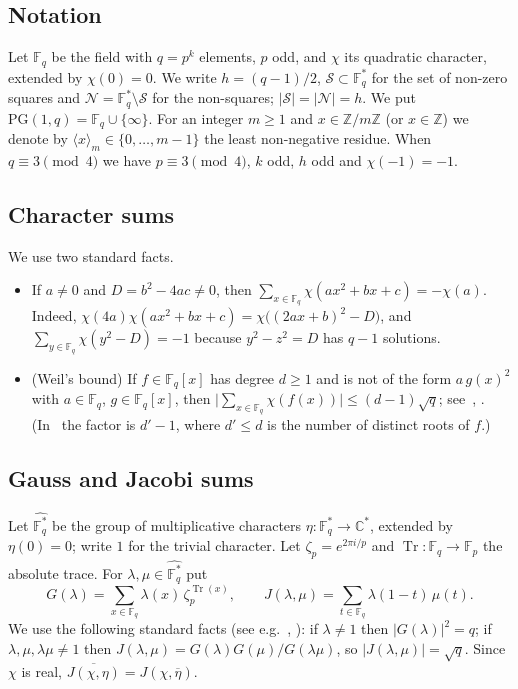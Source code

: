 \documentclass[11pt]{amsart}
\theoremstyle{definition}
\theoremstyle{remark}
\numberwithin{equation}{section}
\newcommand{\F}{\mathbb{F}_q}
\newcommand{\Fs}{\mathbb{F}_q^{*}}
\newcommand{\PGone}{\mathrm{PG}(1,q)}
\newcommand{\Sq}{\mathcal{S}}
\newcommand{\Ns}{\mathcal{N}}
\newcommand{\Z}{\mathbb{Z}}
\newcommand{\C}{\mathbb{C}}
\newcommand{\res}[2]{\langle #1\rangle_{#2}}
\newcommand{\conj}[1]{\overline{#1}}
\DeclareMathOperator{\Tr}{Tr}
\begin{document}
\subsection{Notation}
Let $\F$ be the field with $q=p^k$ elements, $p$ odd, and $\chi$ its quadratic character, extended by $\chi(0)=0$. We write
$h=(q-1)/2$, $\Sq\subset\Fs$ for the set of non-zero squares and $\Ns=\Fs\setminus\Sq$ for the non-squares; $|\Sq|=|\Ns|=h$.
We put $\PGone=\F\cup\{\infty\}$. For an integer $m\ge1$ and $x\in\Z/m\Z$ (or $x\in\Z$) we denote by $\res{x}{m}\in\{0,\dots,m-1\}$
the least non-negative residue. When $q\equiv3\pmod 4$ we have $p\equiv3\pmod4$, $k$ odd, $h$ odd and $\chi(-1)=-1$.

\subsection{Character sums}
We use two standard facts.
\begin{itemize}
\item[(W0)] If $a\ne0$ and $D=b^2-4ac\ne0$, then $\sum_{x\in\F}\chi(ax^2+bx+c)=-\chi(a)$. Indeed,
$\chi(4a)\chi(ax^2+bx+c)=\chi\bigl((2ax+b)^2-D\bigr)$, and $\sum_{y\in\F}\chi(y^2-D)=-1$ because $y^2-z^2=D$ has $q-1$ solutions.
\item[(W)] (Weil's bound) If $f\in\F[x]$ has degree $d\ge1$ and is not of the form $a\,g(x)^2$ with $a\in\F$, $g\in\F[x]$, then
$\bigl|\sum_{x\in\F}\chi(f(x))\bigr|\le(d-1)\sqrt q$; see~\cite[Theorem~5.41]{LN}, \cite{Schmidt}. (In~\cite{LN} the
factor is $d'-1$, where $d'\le d$ is the number of distinct roots of $f$.)
\end{itemize}

\subsection{Gauss and Jacobi sums}
Let $\widehat{\Fs}$ be the group of multiplicative characters $\eta\colon\Fs\to\C^*$, extended by $\eta(0)=0$; write $1$ for the
trivial character. Let $\zeta_p=e^{2\pi i/p}$ and $\Tr\colon\F\to\mathbb F_p$ the absolute trace. For $\lambda,\mu\in\widehat{\Fs}$ put
\[
G(\lambda)=\sum_{x\in\F}\lambda(x)\,\zeta_p^{\Tr(x)},\qquad J(\lambda,\mu)=\sum_{t\in\F}\lambda(1-t)\,\mu(t).
\]
We use the following standard facts (see e.g.~\cite[Chapter~5]{LN}, \cite{BEW}): if $\lambda\ne1$ then $|G(\lambda)|^2=q$; if
$\lambda,\mu,\lambda\mu\ne1$ then $J(\lambda,\mu)=G(\lambda)G(\mu)/G(\lambda\mu)$, so $|J(\lambda,\mu)|=\sqrt q$. Since $\chi$ is
real, $\conj{J(\chi,\eta)}=J(\chi,\conj\eta)$.
\end{document}
